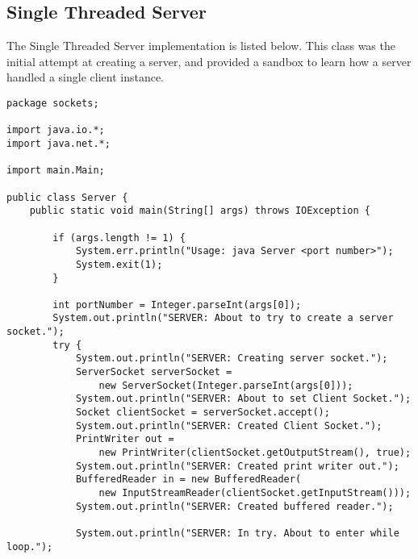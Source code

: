 \documentclass{article}
\begin{document}
	\subsection{Single Threaded Server}
	The Single Threaded Server implementation is listed below. This class was the initial attempt at creating a server, and provided a sandbox to learn how a server handled a single client instance.
		\begin{lstlisting}
package sockets;

import java.io.*;
import java.net.*;

import main.Main;

public class Server {
    public static void main(String[] args) throws IOException {
        
        if (args.length != 1) {
            System.err.println("Usage: java Server <port number>");
            System.exit(1);
        }
        
        int portNumber = Integer.parseInt(args[0]);
    	System.out.println("SERVER: About to try to create a server socket.");
        try {
       		System.out.println("SERVER: Creating server socket.");
            ServerSocket serverSocket =
                new ServerSocket(Integer.parseInt(args[0]));
            System.out.println("SERVER: About to set Client Socket.");
            Socket clientSocket = serverSocket.accept();
            System.out.println("SERVER: Created Client Socket.");
            PrintWriter out =
                new PrintWriter(clientSocket.getOutputStream(), true);
            System.out.println("SERVER: Created print writer out.");
            BufferedReader in = new BufferedReader(
                new InputStreamReader(clientSocket.getInputStream()));
            System.out.println("SERVER: Created buffered reader.");
            
            System.out.println("SERVER: In try. About to enter while loop.");


\end{lstlisting}
\end{document}
